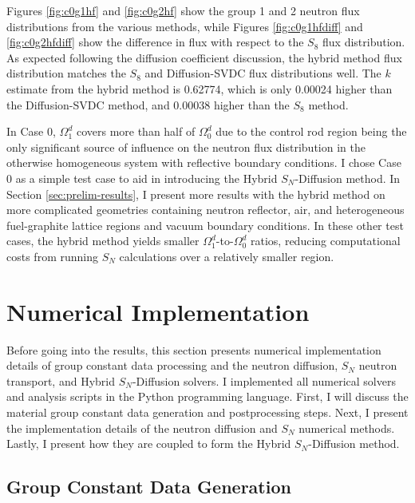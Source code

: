 Figures \ref{fig:c0g1hf} and \ref{fig:c0g2hf} show the group 1 and 2 neutron flux distributions
from the various methods, while Figures \ref{fig:c0g1hfdiff} and \ref{fig:c0g2hfdiff} show the
difference in flux with respect to the $S_8$ flux distribution. As
expected following the diffusion coefficient discussion, the hybrid method flux distribution
matches the $S_8$ and Diffusion-\gls{SVDC} flux distributions well. The $k$ estimate from the
hybrid method is 0.62774, which is only 0.00024 higher than the Diffusion-\gls{SVDC} method, and
0.00038 higher than the $S_8$ method.

In Case 0, $\Omega^d_1$ covers more than half of $\Omega^d_0$ due to the control rod region being
the only significant source of influence on the neutron flux distribution in the
otherwise homogeneous system with reflective boundary conditions. I chose Case 0 as a simple test
case to aid in introducing the Hybrid $S_N$-Diffusion method. In Section \ref{sec:prelim-results},
I present more results with the hybrid method on more complicated geometries containing neutron
reflector, air, and heterogeneous fuel-graphite lattice regions and vacuum boundary conditions. In
these other test cases, the hybrid method yields smaller $\Omega^d_1$-to-$\Omega^d_0$ ratios,
reducing computational costs from running $S_N$ calculations over a relatively smaller
region.

\section{Numerical Implementation} \label{sec:implementation}

Before going into the results, this section presents numerical implementation details of group
constant data processing and the neutron diffusion, $S_N$ neutron transport, and Hybrid
$S_N$-Diffusion solvers. I implemented all numerical solvers and analysis scripts in the Python
programming language. First, I will discuss the material group constant data generation and
postprocessing steps. Next, I present the implementation details of the neutron
diffusion and $S_N$ numerical methods. Lastly, I present how they are coupled to form the Hybrid
$S_N$-Diffusion method.

\subsection{Group Constant Data Generation}

